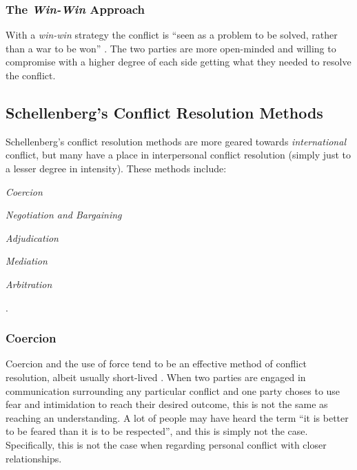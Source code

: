 \documentclass[stu,12pt]{apa7}
\begin{document}
      \subsubsection{The \textit{Win-Win} Approach}
        With a \textit{win-win} strategy the conflict is ``seen as a problem
          to be solved, rather than a war to be won''
          \parencite[pp. 5]{fisher_sources_2000}. The two parties are more
          open-minded and willing to compromise with a higher degree of each
          side getting what they needed to resolve the conflict.

    \subsection{Schellenberg's Conflict Resolution Methods}
      Schellenberg's conflict resolution methods are more geared towards
        \textit{international} conflict, but many have a place in interpersonal
        conflict resolution (simply just to a lesser degree in intensity).
        These methods include:
        \begin{seriate}
          \item \textit{Coercion}
          \item \textit{Negotiation and Bargaining}
          \item \textit{Adjudication}
          \item \textit{Mediation}
          \item \textit{Arbitration}
        \end{seriate}
        \parencite[pp. 117--213]{schellenberg_conflict_1996}.

        \subsubsection{Coercion}
          Coercion and the use of force tend to be an effective method of
            conflict resolution, albeit usually short-lived
            \parencite[pp. 134]{schellenberg_conflict_1996}. When two parties
            are engaged in communication surrounding any particular conflict
            and one party choses to use fear and intimidation to reach their
            desired outcome, this is not the same as reaching an understanding.
            A lot of people may have heard the term ``it is better to be feared
            than it is to be respected'', and this is simply not the case.
            Specifically, this is not the case when regarding personal conflict
            with closer relationships.
\end{document}
